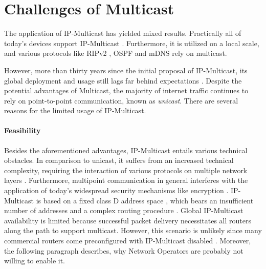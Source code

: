 \section{Challenges of Multicast} %
\label{sec:Challenges of Multicast}


The application of IP-Multicast has yielded mixed results.
Practically all of today's devices support IP-Multicast
    \cite{ratnasamy2006revisiting}.
Furthermore, it is utilized on a local scale, and various protocols like RIPv2
    \cite{rfc2453_rip}, OSPF \cite{rfc2328_ospf} and mDNS \cite{rfc6762_mdns}
    rely on multicast.

However, more than thirty years since the initial proposal of IP-Multicast, its
    global deployment and usage still lags far behind expectations
    \cite{diot2000deployment, ratnasamy2006revisiting}.
Despite the potential advantages of Multicast, the majority of internet traffic
    continues to rely on point-to-point communication, known as
    \textit{unicast}.
There are several reasons for the limited usage of IP-Multicast.

\paragraph{Feasibility} %
\label{par:Feasibility}
Besides the aforementioned advantages, IP-Multicast entails various technical
    obstacles.
In comparison to unicast, it suffers from an increased technical complexity,
    requiring the interaction of various protocols on multiple network layers
    \cite{ratnasamy2006revisiting,diot2000deployment}.
Furthermore, multipoint communication in general interferes with the
    application of today's widespread security mechanisms like encryption
    \cite{rafaeli2003group_key_mgm}.
IP-Multicast is based on a fixed class D address space \cite{rfc1112_ipmc},
    which bears an insufficient number of addresses \cite{meadcast2} and a
    complex routing procedure
    \cite{diot2000deployment,ratnasamy2006revisiting}.
Global IP-Multicast availability is limited because successful packet delivery
    necessitates all routers along the path to support multicast.
However, this scenario is unlikely since many commercial routers come
    preconfigured with IP-Multicast disabled \cite{aruba_doc}.
Moreover, the following paragraph describes, why Network Operators are probably
    not willing to enable it.

